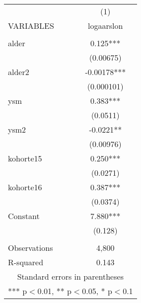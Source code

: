 \documentclass[]{article}
\begin{document}
\begin{tabular}{lc} \hline
 & (1) \\
VARIABLES & logaarslon \\ \hline
 &  \\
alder & 0.125*** \\
 & (0.00675) \\
alder2 & -0.00178*** \\
 & (0.000101) \\
ysm & 0.383*** \\
 & (0.0511) \\
ysm2 & -0.0221** \\
 & (0.00976) \\
kohorte15 & 0.250*** \\
 & (0.0271) \\
kohorte16 & 0.387*** \\
 & (0.0374) \\
Constant & 7.880*** \\
 & (0.128) \\
 &  \\
Observations & 4,800 \\
 R-squared & 0.143 \\ \hline
\multicolumn{2}{c}{ Standard errors in parentheses} \\
\multicolumn{2}{c}{ *** p$<$0.01, ** p$<$0.05, * p$<$0.1} \\
\end{tabular}
\end{document}
